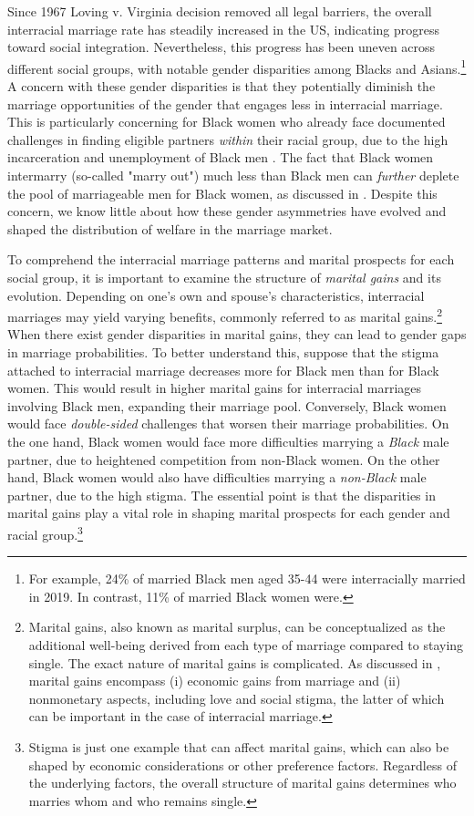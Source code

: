 Since 1967 Loving v. Virginia decision removed all legal barriers, the overall interracial marriage rate has steadily increased in the US, indicating progress toward social integration. Nevertheless, this progress has been uneven across different social groups, with notable gender disparities among Blacks and Asians.\footnote{For example, 24\% of married Black men aged 35-44 were interracially married in 2019. In contrast, 11\% of married Black women were.} A concern with these gender disparities is that they potentially diminish the marriage opportunities of the gender that engages less in interracial marriage. This is particularly concerning for Black women who already face documented challenges in finding eligible partners \textit{within} their racial group, due to the high incarceration and unemployment of Black men \citep{CharlesLuoh_2010_MaleIncarcerationMarriage, CaucuttGunerRauh_2021_BlackWhiteMarraigeGap, Liu_2020_Incarceration}. The fact that Black women intermarry (so-called "marry out") much less than Black men can \textit{further} deplete the pool of marriageable men for Black women, as discussed in \cite{Banks_book_2012}. Despite this concern, we know little about how these gender asymmetries have evolved and shaped the distribution of welfare in the marriage market. 

To comprehend the interracial marriage patterns and marital prospects for each social group, it is important to examine the structure of \textit{marital gains} and its evolution. Depending on one's own and spouse's characteristics, interracial marriages may yield varying benefits, commonly referred to as marital gains.\footnote{Marital gains, also known as marital surplus, can be conceptualized as the additional well-being derived from each type of marriage compared to staying single.  The exact nature of marital gains is complicated. As discussed in \cite{Chiappori_2020_AnnuRevEconMarriage}, marital gains encompass (i) economic gains from marriage and (ii) nonmonetary aspects, including love and social stigma, the latter of which can be important in the case of interracial marriage.} When there exist gender disparities in marital gains, they can lead to gender gaps in marriage probabilities. To better understand this, suppose that the stigma attached to interracial marriage decreases more for Black men than for Black women. This would result in higher marital gains for interracial marriages involving Black men, expanding their marriage pool. Conversely, Black women would face \textit{double-sided} challenges that worsen their marriage probabilities. On the one hand, Black women would face more difficulties marrying a \textit{Black} male partner, due to heightened competition from non-Black women. On the other hand, Black women would also have difficulties marrying a \textit{non-Black} male partner, due to the high stigma. The essential point is that the disparities in marital gains play a vital role in shaping marital prospects for each gender and racial group.\footnote{Stigma is just one example that can affect marital gains, which can also be shaped by economic considerations or other preference factors. Regardless of the underlying factors, the overall structure of marital gains determines who marries whom and who remains single.}

